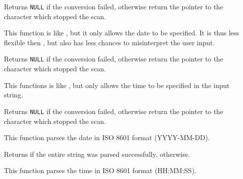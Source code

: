 Returns {\tt NULL} if the conversion failed, otherwise return the pointer to
the character which stopped the scan.


\label{wxdatetimeparsedate}




This function is like , but it
only allows the date to be specified. It is thus less flexible then
, but also has less chances to
misinterpret the user input.

Returns {\tt NULL} if the conversion failed, otherwise return the pointer to
the character which stopped the scan.


\label{wxdatetimeparsetime}




This functions is like , but
only allows the time to be specified in the input string.

Returns {\tt NULL} if the conversion failed, otherwise return the pointer to
the character which stopped the scan.


\label{wxdatetimeparseisodate}


This function parses the date in ISO 8601 format (YYYY-MM-DD).

Returns \true if the entire string was parsed successfully, \false otherwise.


\label{wxdatetimeparseisotime}


This function parses the time in ISO 8601 format (HH:MM:SS).


